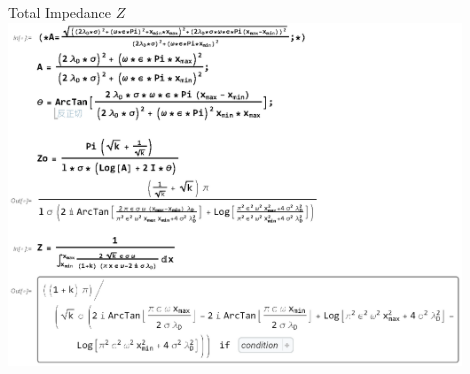 \documentclass[11pt]{beamer}
\begin{document}
\begin{frame}{Total Impedance $Z$}
    \includegraphics[width=0.9\textwidth]{1.eps}
\end{frame}
\end{document}
